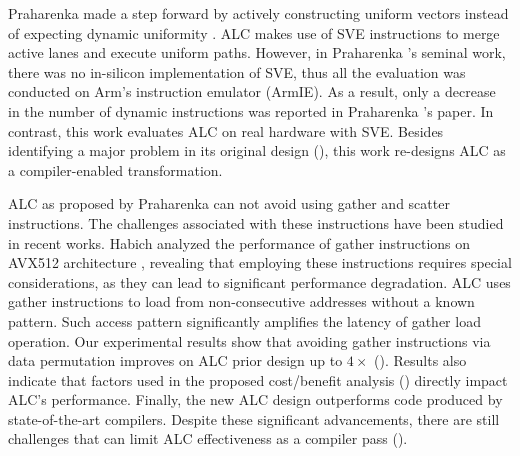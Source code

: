 Praharenka \etal made a step forward by actively constructing uniform vectors instead of expecting dynamic uniformity \cite{praharenka_vectorizing_2022}.
ALC makes use of SVE instructions to merge active lanes and execute uniform paths.
However, in Praharenka \etal's seminal work, there was no in-silicon implementation of SVE, thus all the evaluation was conducted on Arm's instruction emulator (ArmIE).
As a result, only a decrease in the number of dynamic instructions was reported in Praharenka \etal's paper.
In contrast, this work evaluates ALC on real hardware with SVE.
Besides identifying a major problem in its original design (), this work re-designs ALC as a compiler-enabled transformation.

ALC as proposed by Praharenka \etal can not avoid using gather and scatter instructions. The challenges associated with these instructions have been studied in recent works. Habich \etal analyzed the performance of gather instructions on AVX512 architecture \cite{gather-use-or-not}, revealing that employing these instructions requires special considerations, as they can lead to significant performance degradation. ALC uses gather instructions to load from non-consecutive addresses without a known pattern. Such access pattern significantly amplifies the latency of gather load operation. Our experimental results show that avoiding gather instructions via data permutation improves on ALC prior design up to $4\times$ ().
Results also indicate that factors used in the proposed cost/benefit analysis () directly impact ALC's performance.
Finally, the new ALC design outperforms \ifconverted code produced by state-of-the-art compilers.
Despite these significant advancements, there are still challenges that can limit ALC effectiveness as a compiler pass ().

